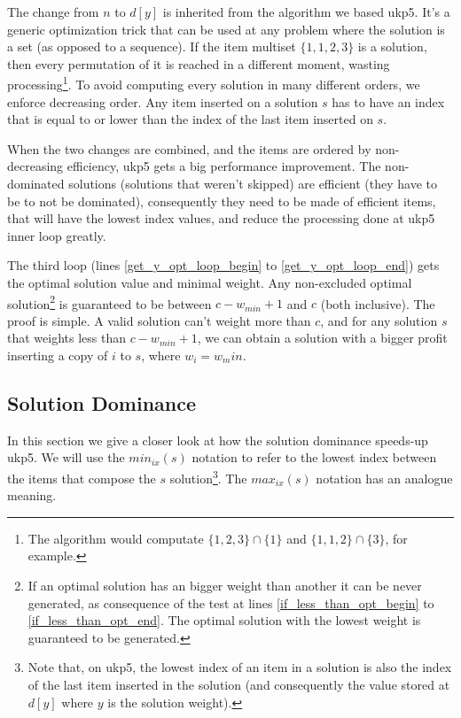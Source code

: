 \documentclass[runningheads,a4paper]{llncs}
\begin{document}
The change from \(n\) to \(d[y]\) is inherited from the algorithm we based ukp5. It's a generic optimization trick that can be used at any problem where the solution is a set (as opposed to a sequence). If the item multiset \(\{1, 1, 2, 3\}\) is a solution, then every permutation of it is reached in a different moment, wasting processing\footnote{The algorithm would computate \(\{1, 2, 3\} \cap \{1\}\) and \(\{1, 1, 2\} \cap \{3\}\), for example.}. To avoid computing every solution in many different orders, we enforce decreasing order. Any item inserted on a solution \(s\) has to have an index that is equal to or lower than the index of the last item inserted on \(s\). 

When the two changes are combined, and the items are ordered by non-decreasing efficiency, ukp5 gets a big performance improvement. The non-dominated solutions (solutions that weren't skipped) are efficient (they have to be to not be dominated), consequently they need to be made of efficient items, that will have the lowest index values, and reduce the processing done at ukp5 inner loop greatly.

The third loop (lines \ref{get_y_opt_loop_begin} to \ref{get_y_opt_loop_end}) gets the optimal solution value and minimal weight. Any non-excluded optimal solution\footnote{If an optimal solution has an bigger weight than another it can be never generated, as consequence of the test at lines \ref{if_less_than_opt_begin} to \ref{if_less_than_opt_end}. The optimal solution with the lowest weight is guaranteed to be generated.} is guaranteed to be between \(c - w_{min} + 1\) and \(c\) (both inclusive). The proof is simple. A valid solution can't weight more than \(c\), and for any solution \(s\) that weights less than \(c - w_{min} + 1\), we can obtain a solution with a bigger profit inserting a copy of \(i\) to \(s\), where \(w_i = w_min\).

\subsection{Solution Dominance}

In this section we give a closer look at how the solution dominance speeds-up ukp5. We will use the \(min_{ix}(s)\) notation to refer to the lowest index between the items that compose the \(s\) solution\footnote{Note that, on ukp5, the lowest index of an item in a solution is also the index of the last item inserted in the solution (and consequently the value stored at \(d[y]\) where \(y\) is the solution weight).}. The \(max_{ix}(s)\) notation has an analogue meaning.
\end{document}
